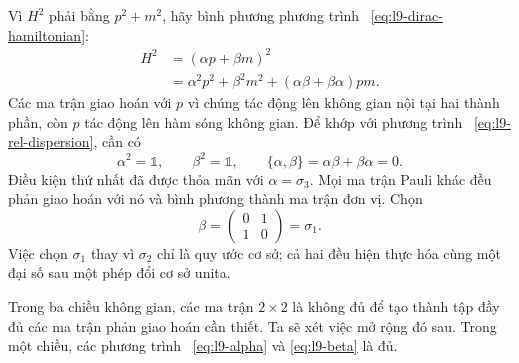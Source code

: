 Vì \(H^2\) phải bằng \(p^2+m^2\), hãy bình phương phương trình ~\eqref{eq:l9-dirac-hamiltonian}:
\begin{align}
H^2
&=(\alpha p+\beta m)^2\\
&=\alpha^2p^2+\beta^2m^2
+(\alpha\beta+\beta\alpha)pm.
\label{eq:l9-square-dirac}
\end{align}
Các ma trận giao hoán với \(p\) vì chúng tác động lên không gian nội tại hai thành phần, còn \(p\) tác động lên hàm sóng không gian. Để khớp với phương trình ~\eqref{eq:l9-rel-dispersion}, cần có
\begin{equation}
\alpha^2=\mathbb{1},
\qquad
\beta^2=\mathbb{1},
\qquad
\{\alpha,\beta\}
=\alpha\beta+\beta\alpha=0.
\label{eq:l9-dirac-algebra}
\end{equation}
Điều kiện thứ nhất đã được thỏa mãn với \(\alpha=\sigma_3\). Mọi ma trận Pauli khác đều phản giao hoán với nó và bình phương thành ma trận đơn vị. Chọn
\begin{equation}
\beta=
\begin{pmatrix}
0&1\\
1&0
\end{pmatrix}
=\sigma_1.
\label{eq:l9-beta}
\end{equation}
Việc chọn \(\sigma_1\) thay vì \(\sigma_2\) chỉ là quy ước cơ sở; cả hai đều hiện thực hóa cùng một đại số sau một phép đổi cơ sở unita.

\begin{classroomqa}
\end{classroomqa}

\begin{classroomqa}
\end{classroomqa}

Trong ba chiều không gian, các ma trận \(2\times2\) là không đủ để tạo thành tập đầy đủ các ma trận phản giao hoán cần thiết. Ta sẽ xét việc mở rộng đó sau. Trong một chiều, các phương trình ~\eqref{eq:l9-alpha} và \eqref{eq:l9-beta} là đủ.

